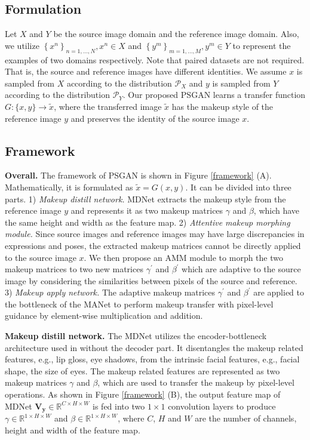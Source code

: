 \subsection{Formulation}

Let $X$ and $Y$ be the source image domain and the reference image domain. 
Also, we utilize $\left\{x^{n}\right\}_{n=1, \ldots, N}, x^{n} \in X$ and $\left\{y^{m}\right\}_{m=1, \ldots, M}, y^{m} \in Y$  to represent the examples of two domains respectively.  Note that paired datasets are not required. That is, the source and reference images have different identities. 
We assume $x$ is sampled from $X$ according to the distribution $\mathcal{P}_{X}$ and  $y$ is sampled from $Y$ according to the distribution $\mathcal{P}_{Y}$.
Our proposed PSGAN learns a transfer function $G: \{x, y\} \rightarrow \tilde{x}$, where the transferred image $\tilde{x}$ has the makeup style of the reference image $y$ and preserves the identity of the source image $x$. 

\subsection{Framework}

\textbf{Overall.} The framework of PSGAN is shown in Figure \ref{framework} (A). 
Mathematically, it is formulated as $\tilde{x}= G(x, y)$.
It can be divided into three parts.
1) \emph{Makeup distill network.} MDNet extracts the makeup style from the reference image $y$ and represents it as two makeup matrices $\gamma$ and $\beta$, which have the same height and width as the feature map.
2)  \emph{Attentive makeup morphing module.}  Since source images and reference images may have large discrepancies in expressions and poses, the extracted makeup matrices cannot be directly applied to the source image $x$. We then propose an AMM module to morph the two makeup matrices to two new matrices $\gamma^{\prime}$ and $\beta^{\prime}$ which are adaptive to the source image by considering the similarities between pixels of the source and reference.
3) \emph{Makeup apply network.} The adaptive makeup matrices $\gamma^{\prime}$ and $\beta^{\prime}$ are applied to the bottleneck of the MANet to perform makeup transfer with pixel-level guidance by element-wise multiplication and addition.

\textbf{Makeup distill network.} The MDNet utilizes the encoder-bottleneck architecture used in  \cite{Choi2017StarGANUG} without the decoder part. 
It disentangles the makeup related features, e.g., lip gloss, eye shadows, from the intrinsic facial features, e.g., facial shape, the size of eyes.
The makeup related features are represented as two makeup matrices  $\gamma$ and $\beta$, which are used to transfer the makeup by pixel-level operations. As shown in Figure \ref{framework} (B), the output feature map of MDNet $\mathbf{V_y}\in \mathbb{R}^{C \times H \times W}$ is fed into two $1\times1$ convolution layers to produce $\gamma \in \mathbb{R}^{1\times H \times W}$ and $\beta \in \mathbb{R}^{1 \times H \times W}$, where $C$, $H$ and $W$ are the number of channels, height and width of the feature map.

